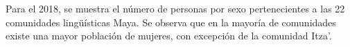 Para el 2018, se muestra el número de personas por sexo pertenecientes a las 22 comunidades lingüísticas Maya. Se observa que en la mayoría de comunidades existe una mayor población de mujeres, con excepción de la comunidad Itza’.